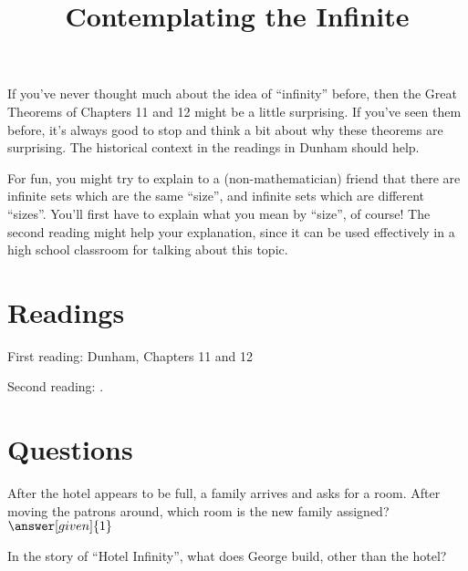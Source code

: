 \documentclass[nooutcomes]{ximera}
\title{Contemplating the Infinite}
\begin{document}
\begin{abstract}
    
\end{abstract}
\maketitle

If you've never thought much about the idea of ``infinity'' before, then the Great Theorems of Chapters 11 and 12 might be a little surprising.  If you've seen them before, it's always good to stop and think a bit about why these theorems are surprising.  The historical context in the readings in Dunham should help.

For fun, you might try to explain to a (non-mathematician) friend that there are infinite sets which are the same ``size'', and infinite sets which are different ``sizes''.  You'll first have to explain what you mean by ``size'', of course!  The second reading might help your explanation, since it can be used effectively in a high school classroom for talking about this topic.




\section{Readings}
First reading: Dunham, Chapters 11 and 12

Second reading: .



\section{Questions}

\begin{question}
After the hotel appears to be full, a family arrives and asks for a room.  After moving the patrons around, which room is the new family assigned?
$\answer[given]{1}$
\end{question}

\begin{question}
In the story of ``Hotel Infinity'', what does George build, other than the hotel?
\begin{multipleChoice}
\end{multipleChoice}
\end{question}

%
%
\end{document}

